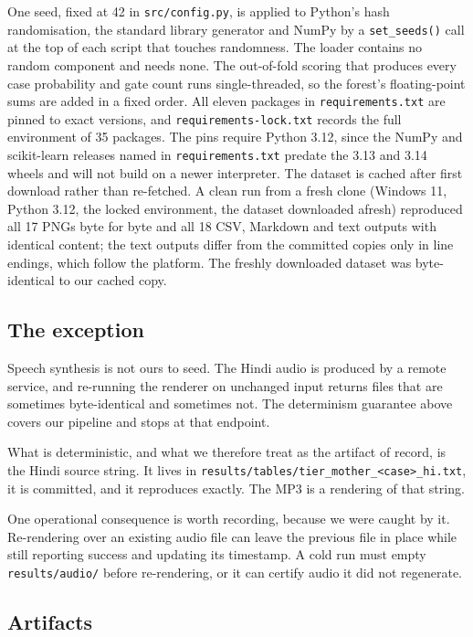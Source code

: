 One seed, fixed at 42 in \texttt{src/config.py}, is applied to Python's hash
randomisation, the standard library generator and NumPy by a \texttt{set\_seeds()}
call at the top of each script that touches randomness. The loader contains
no random component and needs none. The out-of-fold scoring that produces
every case probability and gate count runs single-threaded, so the forest's
floating-point sums are added in a fixed order. All eleven packages in
\texttt{requirements.txt} are pinned to exact versions, and
\texttt{requirements-lock.txt} records the full environment of 35 packages.
The pins require Python 3.12, since the NumPy and scikit-learn releases named
in \texttt{requirements.txt} predate the 3.13 and 3.14 wheels and will not
build on a newer interpreter. The dataset is cached after first download rather
than re-fetched. A clean run from a fresh clone (Windows 11, Python 3.12, the
locked environment, the dataset downloaded afresh) reproduced all 17 PNGs
byte for byte and all 18 CSV, Markdown and text outputs with identical
content; the text outputs differ from the committed copies only in line
endings, which follow the platform. The freshly downloaded dataset was
byte-identical to our cached copy.

\subsection{The exception}

Speech synthesis is not ours to seed. The Hindi audio is produced by a remote
service, and re-running the renderer on unchanged input returns files that
are sometimes byte-identical and sometimes not. The
determinism guarantee above covers
our pipeline and stops at that endpoint.

What is deterministic, and what we therefore treat as the artifact of record,
is the Hindi source string. It lives in
\texttt{results/tables/tier\_mother\_<case>\_hi.txt}, it is committed, and it
reproduces exactly. The MP3 is a rendering of that string.

One operational consequence is worth recording, because we were caught by it.
Re-rendering over an existing audio file can leave the previous file in place
while still reporting success and updating its timestamp. A cold run must
empty \texttt{results/audio/} before re-rendering, or it can certify audio it
did not regenerate.

\subsection{Artifacts}

